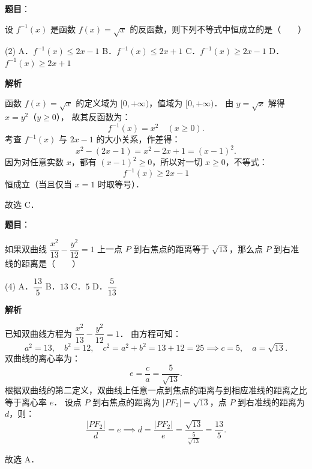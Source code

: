 \begin{answer}

\textbf{题目}：

设 $f^{-1}(x)$ 是函数 $f(x) = \sqrt{x}$ 的反函数，则下列不等式中恒成立的是\mbox{（　　）}

\begin{gkopts}(2)
\task A．$f^{-1}(x) \leqslant 2x - 1$
\task B．$f^{-1}(x) \leqslant 2x + 1$
\task C．$f^{-1}(x) \geqslant 2x - 1$
\task D．$f^{-1}(x) \geqslant 2x + 1$
\end{gkopts}

\textbf{解析}

函数 $f(x) = \sqrt{x}$ 的定义域为 $[0, +\infty)$，值域为 $[0, +\infty)$．
由 $y = \sqrt{x}$ 解得 $x = y^2$（$y \geqslant 0$），
故其反函数为：
\nopagebreak[4]
\[
f^{-1}(x) = x^2 \quad (x \geqslant 0).
\]
考查 $f^{-1}(x)$ 与 $2x - 1$ 的大小关系，作差得：
\nopagebreak[4]
\[
x^2 - (2x - 1) = x^2 - 2x + 1 = (x - 1)^2.
\]
因为对任意实数 $x$，都有 $(x - 1)^2 \geqslant 0$，所以对一切 $x \geqslant 0$，不等式：
\nopagebreak[4]
\[
f^{-1}(x) \geqslant 2x - 1
\]
恒成立（当且仅当 $x = 1$ 时取等号）．

故选 C．


\end{answer}
\begin{answer}

\textbf{题目}：

如果双曲线 $\dfrac{x^2}{13} - \dfrac{y^2}{12} = 1$ 上一点 $P$ 到右焦点的距离等于 $\sqrt{13}$，那么点 $P$ 到右准线的距离是\mbox{（　　）}

\begin{gkopts}(4)
\task A．$\dfrac{13}{5}$
\task B．$13$
\task C．$5$
\task D．$\dfrac{5}{13}$
\end{gkopts}

\textbf{解析}

已知双曲线方程为 $\dfrac{x^2}{13} - \dfrac{y^2}{12} = 1$．
由方程可知：
\nopagebreak[4]
\[
a^2 = 13, \quad b^2 = 12, \quad c^2 = a^2 + b^2 = 13 + 12 = 25 \implies c = 5, \quad a = \sqrt{13}.
\]
双曲线的离心率为：
\nopagebreak[4]
\[
e = \frac{c}{a} = \frac{5}{\sqrt{13}}.
\]
根据双曲线的第二定义，双曲线上任意一点到焦点的距离与到相应准线的距离之比等于离心率 $e$．
设点 $P$ 到右焦点的距离为 $|PF_2| = \sqrt{13}$，点 $P$ 到右准线的距离为 $d$，则：
\nopagebreak[4]
\[
\frac{|PF_2|}{d} = e \implies d = \frac{|PF_2|}{e} = \frac{\sqrt{13}}{\frac{5}{\sqrt{13}}} = \frac{13}{5}.
\]

故选 A．


\end{answer}
